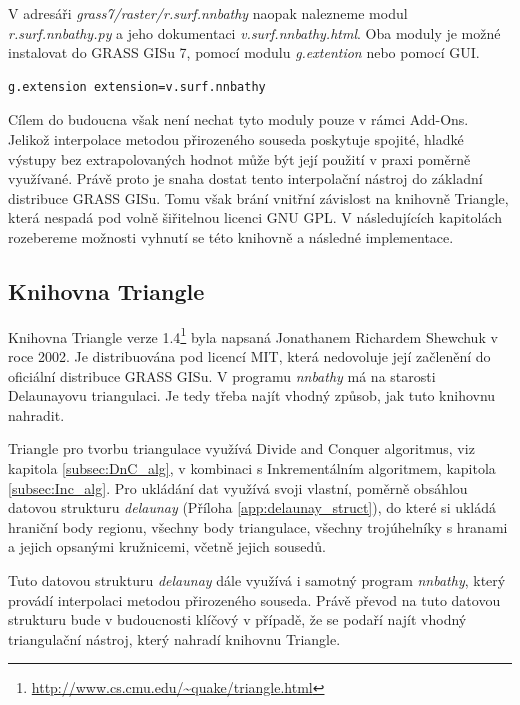 \documentclass[12pt,a4paper]{article}
\begin{document}
{V adresáři \emph{grass7/raster/r.surf.nnbathy} naopak nalezneme modul
\emph{r.surf.nnbathy.py} a jeho dokumentaci
\emph{v.surf.nnbathy.html}. Oba moduly je možné instalovat do GRASS
GISu 7, pomocí modulu \emph{g.extention} nebo pomocí GUI.

\bigskip
\begin{lstlisting}[caption={Stáhnutí modulu v.surf.nnbathy pomocí g.extention}]
g.extension extension=v.surf.nnbathy
\end{lstlisting}

\bigskip 

Cílem do budoucna však není nechat tyto moduly pouze v rámci
Add-Ons. Jelikož interpolace metodou přirozeného souseda poskytuje
spojité, hladké výstupy bez extrapolovaných hodnot může být její
použití v praxi poměrně využívané. Právě proto je snaha dostat tento
interpolační nástroj do základní distribuce GRASS GISu. Tomu však
brání vnitřní závislost na knihovně Triangle, která nespadá pod volně
šiřitelnou licenci GNU GPL. V následujících kapitolách rozebereme
možnosti vyhnutí se této knihovně a následné implementace.

\newpage
\subsection{Knihovna Triangle}

Knihovna Triangle verze
1.4\footnote{\url{http://www.cs.cmu.edu/~quake/triangle.html}} byla napsaná
Jonathanem Richardem Shewchuk v roce 2002. Je distribuována pod
licencí MIT, která nedovoluje její začlenění do oficiální distribuce GRASS
GISu. V programu \emph{nnbathy} má na starosti Delaunayovu
triangulaci. Je tedy třeba najít vhodný způsob, jak tuto knihovnu
nahradit.

Triangle pro tvorbu triangulace využívá Divide and Conquer algoritmus,
viz kapitola \ref{subsec:DnC_alg}, v kombinaci s Inkrementálním
algoritmem, kapitola \ref{subsec:Inc_alg}. Pro ukládání dat využívá
svoji vlastní, poměrně obsáhlou datovou strukturu \emph{delaunay}
(Příloha \ref{app:delaunay_struct}), do které si ukládá hraniční body
regionu, všechny body triangulace, všechny trojúhelníky s hranami a
jejich opsanými kružnicemi, včetně jejich sousedů.

Tuto datovou strukturu \emph{delaunay} dále využívá i samotný program
\emph{nnbathy}, který provádí interpolaci metodou přirozeného
souseda. Právě převod na tuto datovou strukturu bude v budoucnosti
klíčový v případě, že se podaří najít vhodný triangulační nástroj,
který nahradí knihovnu Triangle.

}
\end{document}
